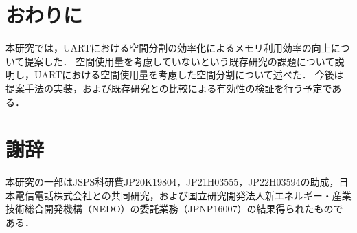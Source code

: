 \chapter{おわりに}

本研究では，UARTにおける空間分割の効率化によるメモリ利用効率の向上について提案した．
空間使用量を考慮していないという既存研究の課題について説明し，UARTにおける空間使用量を考慮した空間分割について述べた．
今後は提案手法の実装，および既存研究との比較による有効性の検証を行う予定である．





\chapter*{謝辞}

本研究の一部はJSPS科研費JP20K19804，JP21H03555，JP22H03594の助成，日本電信電話株式会社との共同研究，および国立研究開発法人新エネルギー・産業技術総合開発機構（NEDO）の委託業務（JPNP16007）の結果得られたものである．